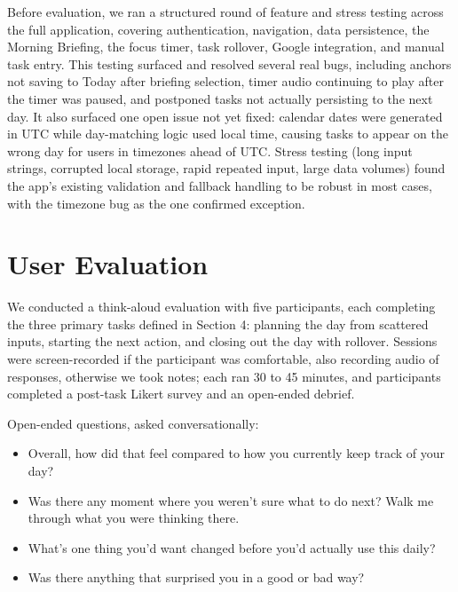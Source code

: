 \documentclass[sigplan,screen]{acmart}
\begin{document}
Before evaluation, we ran a structured round of feature and stress testing across the full application, covering authentication, navigation, data persistence, the Morning Briefing, the focus timer, task rollover, Google integration, and manual task entry. This testing surfaced and resolved several real bugs, including anchors not saving to Today after briefing selection, timer audio continuing to play after the timer was paused, and postponed tasks not actually persisting to the next day. It also surfaced one open issue not yet fixed: calendar dates were generated in UTC while day-matching logic used local time, causing tasks to appear on the wrong day for users in timezones ahead of UTC. Stress testing (long input strings, corrupted local storage, rapid repeated input, large data volumes) found the app's existing validation and fallback handling to be robust in most cases, with the timezone bug as the one confirmed exception.

\section{User Evaluation}
We conducted a think-aloud evaluation with five participants, each completing the three primary tasks defined in Section 4: planning the day from scattered inputs, starting the next action, and closing out the day with rollover. Sessions were screen-recorded if the participant was comfortable, also recording audio of responses, otherwise we took notes; each ran 30 to 45 minutes, and participants completed a post-task Likert survey and an open-ended debrief.

Open-ended questions, asked conversationally:
\begin{itemize}
  \item Overall, how did that feel compared to how you currently keep track of your day?
  \item Was there any moment where you weren't sure what to do next? Walk me through what you were thinking there.
  \item What's one thing you'd want changed before you'd actually use this daily?
  \item Was there anything that surprised you in a good or bad way?
\end{itemize}
\end{document}
